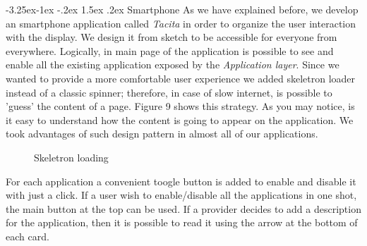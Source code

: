 \documentclass[]{usiinfbachelorproject}
\makeatletter
\newcommand\subsubsection{\@startsection{subsubsection}{3}{\z@}%
                {-3.25ex\@plus -1ex \@minus -.2ex}%
                {1.5ex \@plus .2ex}%
                {\normalfont\normalsize\bfseries}}
\makeatother
\begin{document}
\subsubsection{Smartphone}
As we have explained before, we develop an smartphone application called \emph{Tacita} in order to organize the user interaction with the display. We design it from sketch to be accessible for everyone from everywhere. 
Logically, in main page of the application is possible to see and enable all the existing application exposed by the \emph{Application layer}. Since we wanted to provide a more comfortable user experience we added skeletron loader instead of a classic spinner; therefore, in case of slow internet, is possible to 'guess' the content of a page. Figure 9 shows this strategy. As you may notice, is it easy to understand how the content is going to appear on the application. We took advantages of such design pattern in almost all of our applications.
\begin{figure}[H]
\centering
{}
\caption{Skeletron loading}
\end{figure}
For each application a convenient toogle button is added to enable and disable it with just a click. If a user wish to enable/disable all the applications in one shot, the main button at the top can be used. If a provider decides to add a description for the application, then it is possible to read it using the arrow at the bottom of each card.
\end{document}
